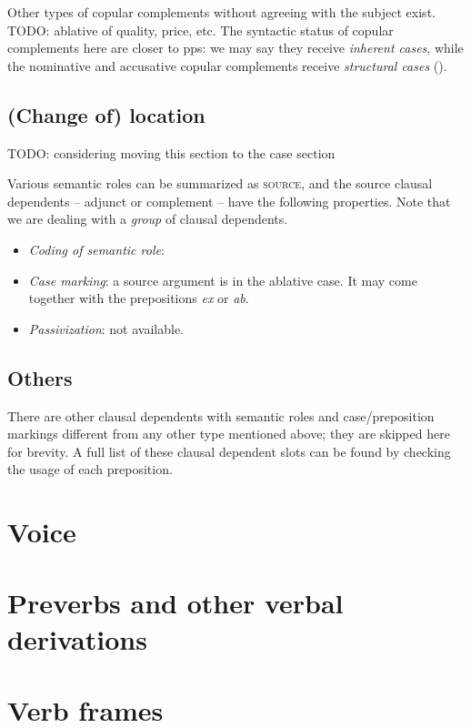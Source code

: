 \documentclass[a4paper, oneside]{report}
\newcommand{\form}[1]{\emph{#1}}
\newcommand*{\category}[1]{\textsc{#1}}
\begin{document}
Other types of copular complements without agreeing with the subject exist.
TODO: ablative of quality, price, etc. 
The syntactic status of copular complements here are closer to \acs{pp}s:
we may say they receive \emph{inherent cases},
while the nominative and accusative copular complements 
receive \emph{structural cases} 
().

\subsection{(Change of) location}

TODO: considering moving this section to the case section

Various semantic roles can be summarized as \category{source}, 
and the source clausal dependents -- adjunct or complement -- have the following properties.
Note that we are dealing with a \emph{group} of clausal dependents.
\begin{itemize}
    \item \emph{Coding of semantic role}: 
        
    \item \emph{Case marking}: a source argument is in the ablative case.
        It may come together with the prepositions \form{ex} or \form{ab}.
    \item \emph{Passivization}: not available.
\end{itemize}

\subsection{Others}

There are other clausal dependents with semantic roles and case/preposition markings 
different from any other type mentioned above;
they are skipped here for brevity.
A full list of these clausal dependent slots can be found by checking the usage of each preposition. 

\section{Voice}\label{sec:passive}

\section{Preverbs and other verbal derivations}

\section{Verb frames}\label{sec:verb-phrase.verb-frame}
\end{document}
